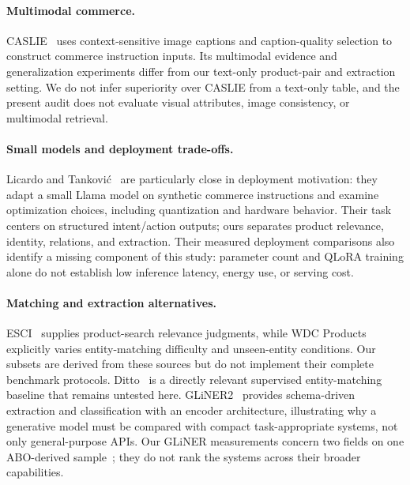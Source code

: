 \paragraph{Multimodal commerce.}
CASLIE~\cite{caslie} uses context-sensitive image captions and caption-quality selection to construct commerce instruction inputs. Its multimodal evidence and generalization experiments differ from our text-only product-pair and extraction setting. We do not infer superiority over CASLIE from a text-only table, and the present audit does not evaluate visual attributes, image consistency, or multimodal retrieval.

\paragraph{Small models and deployment trade-offs.}
Licardo and Tankovi\'{c}~\cite{tradeoffs} are particularly close in deployment motivation: they adapt a small Llama model on synthetic commerce instructions and examine optimization choices, including quantization and hardware behavior. Their task centers on structured intent/action outputs; ours separates product relevance, identity, relations, and extraction. Their measured deployment comparisons also identify a missing component of this study: parameter count and QLoRA training alone do not establish low inference latency, energy use, or serving cost.

\paragraph{Matching and extraction alternatives.}
ESCI~\cite{esci} supplies product-search relevance judgments, while WDC Products~\cite{wdcproducts} explicitly varies entity-matching difficulty and unseen-entity conditions. Our subsets are derived from these sources but do not implement their complete benchmark protocols. Ditto~\cite{ditto} is a directly relevant supervised entity-matching baseline that remains untested here. GLiNER2~\cite{gliner2} provides schema-driven extraction and classification with an encoder architecture, illustrating why a generative model must be compared with compact task-appropriate systems, not only general-purpose APIs. Our GLiNER measurements concern two fields on one ABO-derived sample~\cite{abo}; they do not rank the systems across their broader capabilities.


